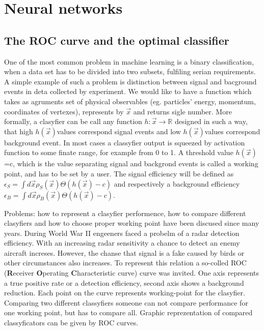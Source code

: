 \newcommand{\h}{$h(\vec{x})$}
\newcommand{\e}{\epsilon}
\chapter{Neural networks}\label{chapter:NN}



\section{The ROC curve and the optimal classifier}
One of the most common problem in machine learning is a binary classification, when a data set has to be divided into two subsets, fulfiling serian requirements. A simple example of such a problem is distinction between signal and bacground events in deta collected by experiment. We would like to have a function which takes as agruments set of physical observables (eg. particles' energy, momentum, coordinates of vertexes), represents by $\vec{x}$ and returns sigle number. More formally, a clasyfier can be call any function $h: \vec x \rightarrow \mathbb{R}$ designed in such a way, that high \h values correspond signal events and low \h values correspond background event. In most cases a classyfier output is squeezed by activation function to some finate range, for example from 0 to 1. A threshold value  \h =c, which is the value separating signal and backgrond events is called a working point, and has to be set by a user. The signal efficiency will be defined as $\e_S=\int d\vec x \rho_S(\vec x) \Theta(h(\vec x) -c)$ and respectively a background efficiency $\e_B=\int d\vec x \rho_B(\vec x) \Theta(h(\vec x) -c)$.

Problems: how to represent a clasyfier performence, how to compare different clasyfiers and how to choose proper working point have been discused since many years. During World War II engeeners faced a probelm of a radar detection efficiency. With an increasing radar sensitivity a chance to detect an enemy aircraft increses. However, the chanse that signal is a fake caused by birds or other circumstances also increases. To represent this relation a so-colled ROC (\textbf{R}eceiver \textbf{O}perating \textbf{C}haracteristic curve) curve was invited. One axis represents a true positive rate  or a detection efficiency, second axis shows a background reduction. Each point on the curve represents working-point for the clasyfier. Comparing two different classyfiers someone can not compare performance for one working point, but has to compare all. Graphic reprezentation of compared classyficators can be given by ROC curves.

